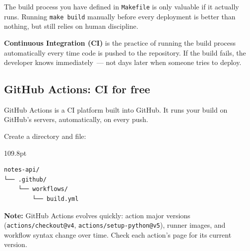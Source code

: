 The build process you have defined in \texttt{Makefile} is only valuable if it actually runs. Running \texttt{make\ build} manually before every deployment is better than nothing, but still relies on human discipline.

\textbf{Continuous Integration (CI)} is the practice of running the build process automatically every time code is pushed to the repository. If the build fails, the developer knows immediately~--- not days later when someone tries to deploy.

\subsection*{GitHub Actions: CI for free}\label{17-build-process:github-actions-ci-for-free}

GitHub Actions is a CI platform built into GitHub. It runs your build on GitHub's servers, automatically, on every push.

Create a directory and file:

\begin{diagrambox}[short]{109.8pt}
\begin{Verbatim}[fontsize=\fontsize{9.0}{8.55}\selectfont]
notes-api/
└── .github/
    └── workflows/
        └── build.yml
\end{Verbatim}
\end{diagrambox}

\begin{notebox}

\textbf{Note:} GitHub Actions evolves quickly: action major versions (\texttt{actions/}\allowbreak{}\texttt{checkout@v4}, \texttt{actions/}\allowbreak{}\texttt{setup-python@v5}), runner images, and workflow syntax change over time. Check each action's page for its current version.

\end{notebox}

